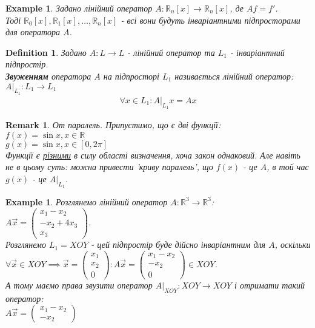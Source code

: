 \documentclass[a4paper, 10pt]{article}
\theoremstyle{theoremdd}
\newtheorem{definition}[theorem]{Definition}
\newtheorem{example}[theorem]{Example}
\newtheorem{remark}[theorem]{Remark}
\begin{document}
\begin{example}
Задано лінійний оператор $A: \mathbb{R}_n[x] \to \mathbb{R}_n[x]$, де $Af = f'$.\\
Тоді $\mathbb{R}_0[x], \mathbb{R}_1[x],\dots,\mathbb{R}_n[x]$ - всі вони будуть інваріантними підпросторами для оператора $A$.
\end{example}

\begin{definition}
Задано $A: L \to L$ - лінійний оператор та $L_1$ - інваріантний підпростір.\\
\textbf{Звуженням} оператора $A$ на підпросторі $L_1$ називається лінійний оператор: $A |_{L_1}: L_1 \to L_1$
\begin{align*}
\forall x \in L_1: A |_{L_1}x = Ax
\end{align*}
\end{definition}

\begin{remark}
От паралель. Припустимо, що є дві функції:\\
$f(x) = \sin x, x \in \mathbb{R}$\\
$g(x) = \sin x, x \in [0,2\pi]$\\
Функції є \underline{різними} в силу області визначення, хоча закон однаковий. Але навіть не в цьому суть: можна привести 'криву паралель', що $f(x)$ - це $A$, в той час $g(x)$ - це $A |_{L_1}$.
\end{remark}

\iffalse
\begin{example}
Розглянемо лінійний оператор $A: \mathbb{R}^3 \to \mathbb{R}^3$:\\
$A \vec{x} = \begin{pmatrix}
x_1 - x_2 \\ -x_2 + 4x_3 \\ x_3
\end{pmatrix}$.\\
Розглянемо $L_1 = XOY$ - цей підпростір буде дійсно інваріантним для $A$, оскільки\\
$\forall \vec{x} \in XOY \implies \vec{x} = \begin{pmatrix}
x_1 \\ x_2 \\ 0
\end{pmatrix}: A \vec{x} = \begin{pmatrix}
x_1 - x_2 \\ -x_2 \\ 0
\end{pmatrix} \in XOY$.\\
А тому маємо права звузити оператор $A|_{XOY}: XOY \to XOY$ і отримати такий оператор:\\
$A \vec{x} = \begin{pmatrix}
x_1 - x_2 \\ -x_2
\end{pmatrix}$
\end{example}
\end{document}
